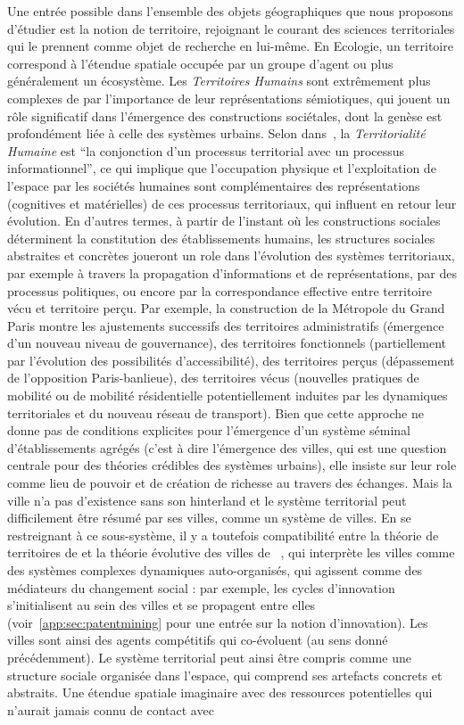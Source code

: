 {}{
Une entrée possible dans l'ensemble des objets géographiques que nous proposons d'étudier est la notion de territoire, rejoignant le courant des sciences territoriales qui le prennent comme objet de recherche en lui-même. En Ecologie, un territoire correspond à l'étendue spatiale occupée par un groupe d'agent ou plus généralement un écosystème. Les \emph{Territoires Humains} sont extrêmement plus complexes de par l'importance de leur représentations sémiotiques, qui jouent un rôle significatif dans l'émergence des constructions sociétales, dont la genèse est profondément liée à celle des systèmes urbains. Selon  dans~\cite{raffestin1988reperes}, la \emph{Territorialité Humaine} est ``la conjonction d'un processus territorial avec un processus informationnel'', ce qui implique que l'occupation physique et l'exploitation de l'espace par les sociétés humaines sont complémentaires des représentations (cognitives et matérielles) de ces processus territoriaux, qui influent en retour leur évolution. En d'autres termes, à partir de l'instant où les constructions sociales déterminent la constitution des établissements humains, les structures sociales abstraites et concrètes joueront un role dans l'évolution des systèmes territoriaux, par exemple à travers la propagation d'informations et de représentations, par des processus politiques, ou encore par la correspondance effective entre territoire vécu et territoire perçu. Par exemple, la construction de la Métropole du Grand Paris montre les ajustements successifs des territoires administratifs (émergence d'un nouveau niveau de gouvernance), des territoires fonctionnels (partiellement par l'évolution des possibilités d'accessibilité), des territoires perçus (dépassement de l'opposition Paris-banlieue), des territoires vécus (nouvelles pratiques de mobilité ou de mobilité résidentielle potentiellement induites par les dynamiques territoriales et du nouveau réseau de transport). Bien que cette approche ne donne pas de conditions explicites pour l'émergence d'un système séminal d'établissements agrégés (c'est à dire l'émergence des villes, qui est une question centrale pour des théories crédibles des systèmes urbains), elle insiste sur leur role comme lieu de pouvoir et de création de richesse au travers des échanges. Mais la ville n'a pas d'existence sans son hinterland et le système territorial peut difficilement être résumé par ses villes, comme un système de villes. En se restreignant à ce sous-système, il y a toutefois compatibilité entre la théorie de territoires de  et la théorie évolutive des villes de ~\cite{pumain2010theorie}, qui interprète les villes comme des systèmes complexes dynamiques auto-organisés, qui agissent comme des médiateurs du changement social : par exemple, les cycles d'innovation s'initialisent au sein des villes et se propagent entre elles (voir~\ref{app:sec:patentmining} pour une entrée sur la notion d'innovation). Les villes sont ainsi des agents compétitifs qui co-évoluent (au sens donné précédemment). Le système territorial peut ainsi être compris comme une structure sociale organisée dans l'espace, qui comprend ses artefacts concrets et abstraits. Une étendue spatiale imaginaire avec des ressources potentielles qui n'aurait jamais connu de contact avec }
